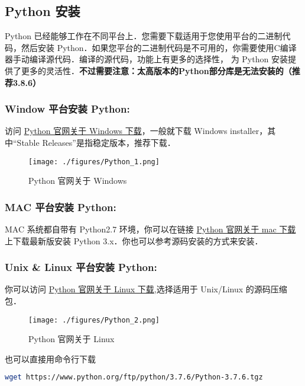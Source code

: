 
\subsection{Python 安装}
Python 已经能够工作在不同平台上．您需要下载适用于您使用平台的二进制代码，然后安装 Python．如果您平台的二进制代码是不可用的，你需要使用C编译器手动编译源代码．编译的源代码，功能上有更多的选择性， 为 Python 安装提供了更多的灵活性．\textbf{不过需要注意：太高版本的Python部分库是无法安装的（推荐3.8.6）}

\subsubsection{Window 平台安装 Python:}
访问 \href{https://www.python.org/downloads/windows/}{Python 官网关于 Windows 下载}，一般就下载  Windows installer，其中“Stable Releases”是指稳定版本，推荐下载．
\begin{figure}[ht]
\centering
\texttt{[image: ./figures/Python\_1.png]}
\caption{Python 官网关于 Windows} \label{Python_fig1}
\end{figure}

\subsubsection{MAC 平台安装 Python:}
MAC 系统都自带有 Python2.7 环境，你可以在链接 \href{https://www.python.org/downloads/mac-osx/}{Python 官网关于 mac 下载} 上下载最新版安装 Python 3.x．你也可以参考源码安装的方式来安装．

\subsubsection{Unix & Linux 平台安装 Python:}
你可以访问 \href{https://www.python.org/downloads/source/}{Python 官网关于 Linux 下载},选择适用于 Unix/Linux 的源码压缩包．
\begin{figure}[ht]
\centering
\texttt{[image: ./figures/Python\_2.png]}
\caption{Python 官网关于 Linux} \label{Python_fig2}
\end{figure}

也可以直接用命令行下载
\begin{lstlisting}[language=bash]
wget https://www.python.org/ftp/python/3.7.6/Python-3.7.6.tgz
\end{lstlisting}

